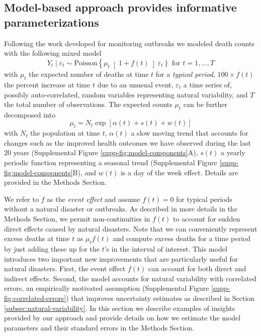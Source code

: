 \documentclass[11pt]{article}
\begin{document}
\subsection{Model-based approach provides informative parameterizations}
\label{subsec:model-based}
Following the work developed for monitoring outbreaks \cite{farrington1996statistical,hohle2008count,noufaily2013improved,salmon2016monitoring} we modeled death counts with the following mixed model
\begin{equation}
    Y_t \mid \varepsilon_t \sim 
    \mbox{Poisson}\left\{ \mu_t \right[1 + f(t) \left]  \varepsilon_t \right\} \mbox{ for } t = 1, \dots,T
\end{equation}
with $\mu_t$ the expected number of deaths at time $t$ for a \emph{typical period}, $100 \times f(t)$ the percent increase at time $t$  due to an unusual event, $\varepsilon_t$ a time series of, possibly auto-correlated, random variables representing natural variability, and $T$ the total number of observations. The expected counts $\mu_t$ can be further decomposed into 
\begin{equation}
    \mu_t =N_t \exp[\alpha(t) + s(t) + w(t)]
    \label{eq:mean-model}
\end{equation}
with $N_t$ the population at time $t$, $\alpha(t)$ a slow moving trend that accounts for changes such as the improved health outcomes we have observed during the last 20 years (Supplemental Figure \ref{supp-fig:model-components}A), $s(t)$ a yearly periodic function representing a seasonal trend (Supplemental Figure \ref{supp-fig:model-components}B), and $w(t)$ is a day of the week effect. Details are provided in the Methods Section.

We refer to $f$ as the \emph{event effect} and assume $f(t) = 0$ for typical periods without a natural disaster or outbreaks.  As described in more details in the Methods Section, we permit non-continuities in $f(t)$ to account for sudden direct effects caused by natural disasters. Note that we can conveniently represent excess deaths at time $t$ as $\mu_t f(t)$ and compute excess deaths for a time period by just adding these up for the $t$'s in the interval of interest. This model introduces two important new improvements that are particularly useful for natural disasters. First, the event effect $f(t)$ can account for both direct and indirect effects. Second, the model accounts for natural variability with correlated errors, an empirically motivated assumption (Supplemental Figure \ref{supp-fig:correlated-errors}) that improves uncertainty estimates as described in Section \ref{subsec:natural-variability}. In this section we describe examples of insights provided by our approach and provide details on how we estimate the model parameters and their standard errors in the Methods Section.
\end{document}
